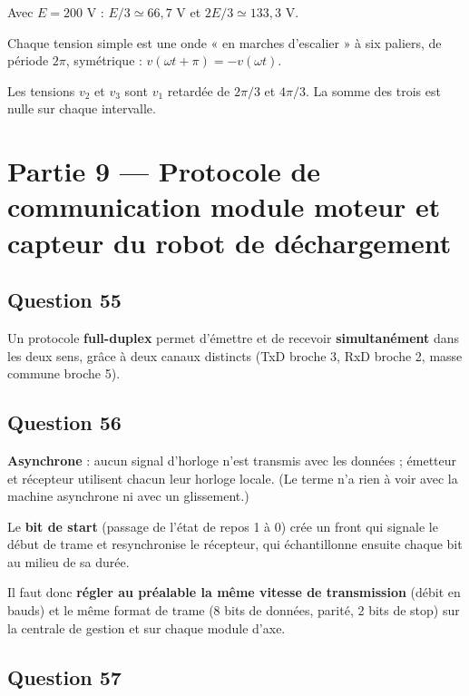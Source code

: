 \documentclass[11pt,a4paper]{article}
\begin{document}
Avec \(E=200\) V : \(E/3\simeq66{,}7\) V et \(2E/3\simeq133{,}3\) V.

Chaque tension simple est une onde « en marches d'escalier » à six paliers, de période \(2\pi\), symétrique : \(v(\omega t+\pi)=-v(\omega t)\).

Les tensions \(v_2\) et \(v_3\) sont \(v_1\) retardée de \(2\pi/3\) et \(4\pi/3\). La somme des trois est nulle sur chaque intervalle.

\hypertarget{partie-9-protocole-de-communication-module-moteur-et-capteur-du-robot-de-duxe9chargement}{%
\section{Partie 9 --- Protocole de communication module moteur et capteur du robot de déchargement}\label{partie-9-protocole-de-communication-module-moteur-et-capteur-du-robot-de-duxe9chargement}}

\hypertarget{question-55}{%
\subsection{Question 55}\label{question-55}}

Un protocole \textbf{full-duplex} permet d'émettre et de recevoir \textbf{simultanément} dans les deux sens, grâce à deux canaux distincts (TxD broche 3, RxD broche 2, masse commune broche 5).

\hypertarget{question-56}{%
\subsection{Question 56}\label{question-56}}

\textbf{Asynchrone} : aucun signal d'horloge n'est transmis avec les données ; émetteur et récepteur utilisent chacun leur horloge locale. (Le terme n'a rien à voir avec la machine asynchrone ni avec un glissement.)

Le \textbf{bit de start} (passage de l'état de repos 1 à 0) crée un front qui signale le début de trame et resynchronise le récepteur, qui échantillonne ensuite chaque bit au milieu de sa durée.

Il faut donc \textbf{régler au préalable la même vitesse de transmission} (débit en bauds) et le même format de trame (8 bits de données, parité, 2 bits de stop) sur la centrale de gestion et sur chaque module d'axe.

\hypertarget{question-57}{%
\subsection{Question 57}\label{question-57}}
\end{document}
